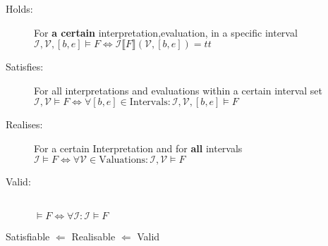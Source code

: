 \begin{tcolorbox}[colback=kapiteleins!5!white, colframe=red!75!black,
  title=\textbf{Validity, Realizability, satisfyability}]
  \begin{description}
  \item[Holds:] For \textbf{a certain} interpretation,evaluation, in a specific
    interval\\
    $\mathcal{I,V},[b,e]\models F \Leftrightarrow
    \mathcal{I}\llbracket F \rrbracket (\mathcal{V},[b,e])=tt$
  \item[Satisfies:] For all interpretations and evaluations within a certain
    interval set\\
    $\mathcal{I,V}\models F \Leftrightarrow
    \forall [b,e]\in \mathrm{Intervals}: \mathcal{I,V},[b,e]\models F$
  \item[Realises:] For a certain Interpretation and for \textbf{all} intervals\\
    $\mathcal{I}\models F
    \Leftrightarrow \forall \mathcal{V}\in \mathrm{Valuations}:
    \mathcal{I,V}\models F$
  \item[Valid:] \ \\
    $\models F
    \Leftrightarrow \forall \mathcal{I}:\mathcal{I}\models F$
  \end{description}
  Satisfiable $\Leftarrow$ Realisable $\Leftarrow$ Valid
\end{tcolorbox}

